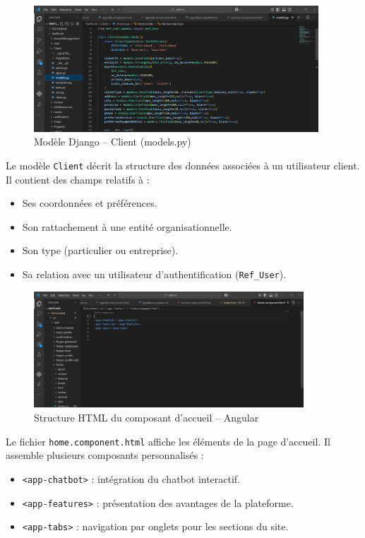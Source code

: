 \vspace{0.5cm}

\begin{figure}[H]
    \centering
    \includegraphics[width=0.95\textwidth]{figures/modele client.png}
    \caption{Modèle Django – Client (models.py)}
\end{figure}

\noindent
Le modèle \texttt{Client} décrit la structure des données associées à un utilisateur client. Il contient des champs relatifs à :
\begin{itemize}
    \item Ses coordonnées et préférences.
    \item Son rattachement à une entité organisationnelle.
    \item Son type (particulier ou entreprise).
    \item Sa relation avec un utilisateur d’authentification (\texttt{Ref\_User}).
\end{itemize}

\vspace{0.5cm}

\begin{figure}[H]
    \centering
    \includegraphics[width=0.9\textwidth]{figures/home comp.png}
    \caption{Structure HTML du composant d’accueil – Angular}
\end{figure}

\noindent
Le fichier \texttt{home.component.html} affiche les éléments de la page d’accueil. Il assemble plusieurs composants personnalisés :
\begin{itemize}
    \item \texttt{<app-chatbot>} : intégration du chatbot interactif.
    \item \texttt{<app-features>} : présentation des avantages de la plateforme.
    \item \texttt{<app-tabs>} : navigation par onglets pour les sections du site.
\end{itemize}


